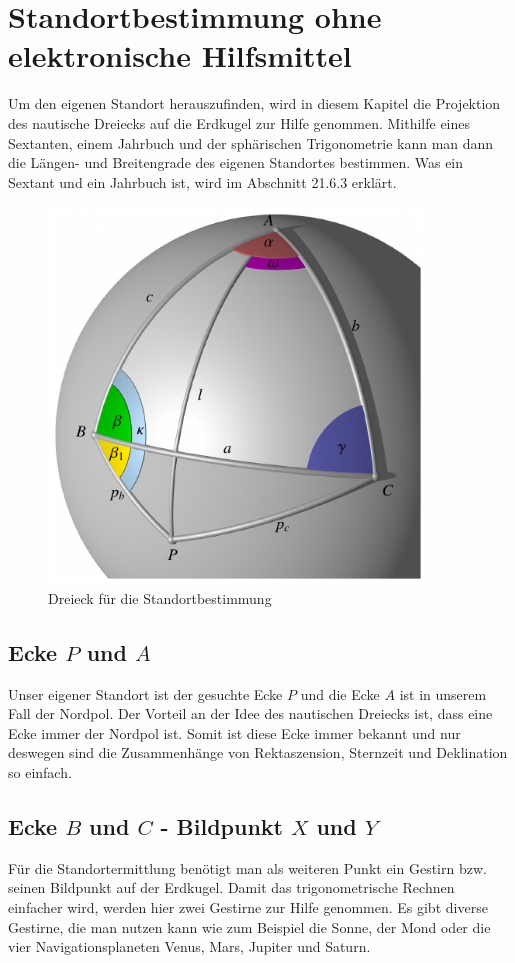 \section{Standortbestimmung ohne elektronische Hilfsmittel}
Um den eigenen Standort herauszufinden, wird in diesem Kapitel die Projektion des nautische Dreiecks auf die Erdkugel zur Hilfe genommen. 
Mithilfe eines Sextanten, einem Jahrbuch und der sphärischen Trigonometrie kann man dann die Längen- und Breitengrade des eigenen Standortes bestimmen.
Was ein Sextant und ein Jahrbuch ist, wird im Abschnitt 21.6.3 erklärt.
\begin{figure}
	\begin{center}
		\includegraphics[width=10cm]{papers/nav/bilder/dreieck.pdf}
		\caption[Dreieck für die Standortbestimmung]{Dreieck für die Standortbestimmung}
	\end{center}
\end{figure}




\subsection{Ecke $P$ und $A$}
Unser eigener Standort ist der gesuchte Ecke $P$ und die Ecke $A$ ist in unserem Fall der Nordpol.
Der Vorteil an der Idee des nautischen Dreiecks ist, dass eine Ecke immer der Nordpol ist. 
Somit ist diese Ecke immer bekannt und nur deswegen sind die Zusammenhänge von Rektaszension, Sternzeit und Deklination so einfach.

\subsection{Ecke $B$ und $C$ - Bildpunkt $X$ und $Y$}
Für die Standortermittlung benötigt man als weiteren Punkt ein Gestirn bzw. seinen Bildpunkt auf der Erdkugel. 
Damit das trigonometrische Rechnen einfacher wird, werden hier zwei Gestirne zur Hilfe genommen.
Es gibt diverse Gestirne, die man nutzen kann wie zum Beispiel die Sonne, der Mond oder die vier Navigationsplaneten Venus, Mars, Jupiter und Saturn.

